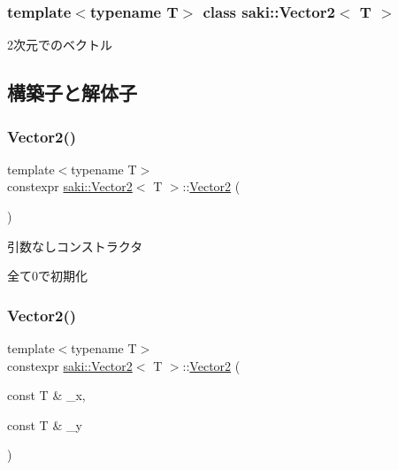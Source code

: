 \subsubsection*{template$<$typename T$>$\newline
class saki\+::\+Vector2$<$ T $>$}

2次元でのベクトル 

\subsection{構築子と解体子}
\mbox{\label{classsaki_1_1_vector2_af57b72f4255812a361bef1922a226f86}} 
\subsubsection{\texorpdfstring{Vector2()}{Vector2()}\hspace{0.1cm}{\footnotesize\ttfamily [1/5]}}
{\footnotesize\ttfamily template$<$typename T$>$ \\
constexpr \mbox{\hyperlink{classsaki_1_1_vector2}{saki\+::\+Vector2}}$<$ T $>$\+::\mbox{\hyperlink{classsaki_1_1_vector2}{Vector2}} (\begin{DoxyParamCaption}{ }\end{DoxyParamCaption})\hspace{0.3cm}{\ttfamily [inline]}}



引数なしコンストラクタ 

全て0で初期化 \mbox{\label{classsaki_1_1_vector2_ad0f3d0a05370f1ef4947520245f6e9a8}} 
\subsubsection{\texorpdfstring{Vector2()}{Vector2()}\hspace{0.1cm}{\footnotesize\ttfamily [2/5]}}
{\footnotesize\ttfamily template$<$typename T$>$ \\
constexpr \mbox{\hyperlink{classsaki_1_1_vector2}{saki\+::\+Vector2}}$<$ T $>$\+::\mbox{\hyperlink{classsaki_1_1_vector2}{Vector2}} (\begin{DoxyParamCaption}\item[{const T \&}]{\+\_\+x,  }\item[{const T \&}]{\+\_\+y }\end{DoxyParamCaption})\hspace{0.3cm}{\ttfamily [inline]}}



